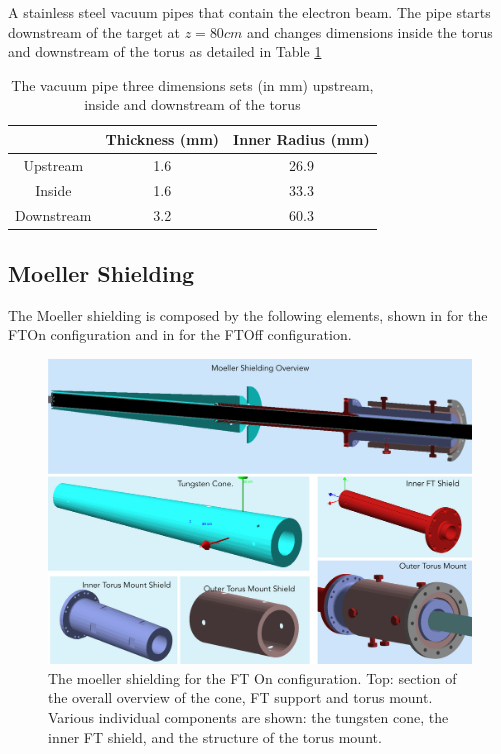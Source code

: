 A stainless steel vacuum pipes that contain the electron beam. The pipe starts downstream of the target at $z=80cm$
and changes dimensions inside the torus and downstream of the torus as detailed in Table \ref{tab:beampipe}

\begin{table}[h]
	\begin{center}
		\begin{tabular}{| c | c | c |}
			\hline \hline
			                & Thickness (mm) & Inner Radius (mm)   \\
			\hline
              Upstream      &    1.6     &    26.9 \\
              Inside        &    1.6     &    33.3 \\
            Downstream      &    3.2     &    60.3 \\
			\hline \hline
		\end{tabular}
	\end{center}
	\caption{The vacuum pipe three dimensions sets (in mm) upstream, inside and downstream of the torus}\label{tab:beampipe}
\end{table}


\subsection{Moeller Shielding}
The Moeller shielding is composed by the following elements, shown in  for the FTOn configuration
and in  for the FTOff configuration.

\begin{figure}
	\centering
	\includegraphics[width=0.98\columnwidth,keepaspectratio]{img/moellerShieldingFTOn.png}
	\caption{The moeller shielding for the FT On configuration. Top: section of the overall overview of the cone, FT support and torus mount.
		     Various individual components are shown: the tungsten cone, the inner FT shield, and the structure of the torus mount.}
	\label{fig:moellerShieldingFTOn}
\end{figure}

